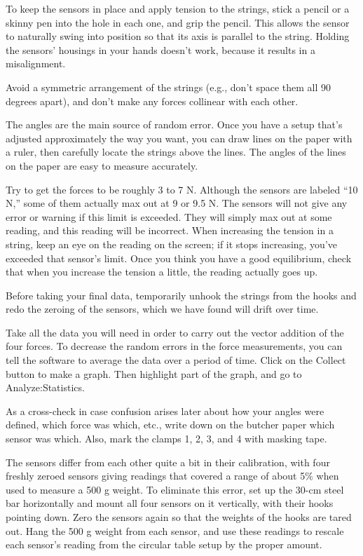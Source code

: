 To keep the sensors in place and apply tension to the strings, stick a pencil or a skinny
pen into the hole in each one, and grip the pencil. This allows the sensor to naturally swing
into position so that its axis is parallel to the string. Holding the sensors' housings in your
hands doesn't work, because it results in a misalignment.

Avoid a symmetric arrangement of
the strings (e.g., don't space them all 90 degrees apart), and
don't make any forces collinear with each other. 


The angles are the main source of random error. Once you have a setup that's adjusted
approximately the way you want, you can draw lines on the paper
with a ruler, then carefully locate the strings above the lines. The angles of the lines on
the paper are easy to measure accurately.

Try to get the forces to be roughly 3 to 7 N.
Although the sensors are labeled ``10 N,'' some of them actually max out at 9 or 9.5 N.
The sensors will not give any
error or warning if this limit is exceeded. They will simply max out at some
reading, and this reading will be incorrect. When increasing the tension in a string, keep an eye
on the reading on the screen; if it stops increasing, you've exceeded that sensor's limit.
Once you think you have a good equilibrium, check that when you increase the tension a little, the
reading actually goes up.

Before taking your final data, temporarily unhook the strings from the hooks and redo the zeroing of the
sensors, which we have found will drift over time.

Take all the data you will need in order to carry out the vector addition of the four forces.
To decrease the random errors in the force measurements, you can tell the software to average
the data over a period of time. Click on the Collect button to make a graph.
Then highlight part of the graph, and go to Analyze:Statistics.

As a cross-check in case confusion arises later about how your angles were defined, which
force was which, etc., write down on the butcher paper which sensor was which.
Also, 
mark the clamps 1, 2, 3, and 4 with masking tape.

The sensors differ from each other quite a bit in their
calibration, with four freshly zeroed sensors giving readings
that covered a range of about 5\% when used to measure a 500 g weight.
To eliminate this error, set up the 30-cm steel bar
horizontally and mount all four sensors on it vertically, with their hooks pointing down.
Zero the sensors again so that the weights of the hooks are tared out.
Hang the 500 g weight from each sensor, and use these readings to
rescale each sensor's reading from the circular table setup by the proper amount.

